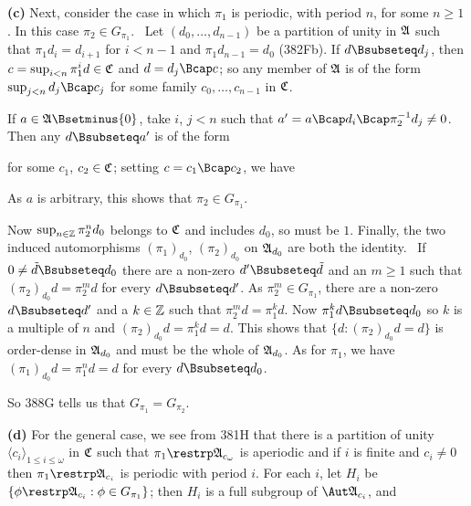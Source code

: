 {\medskip
     
{\bf (c)} Next, consider the case in which $\pi_1$ is periodic, with
period $n$, for some $n\ge 1$.   In this case $\pi_2\in G_{\pi_1}$.
\Prf\ Let $(d_0,\ldots,d_{n-1})$
be a partition of unity in $\frak A$ such that $\pi_1d_i=d_{i+1}$ for
$i<n-1$ and $\pi_1d_{n-1}=d_0$ (382Fb).   If $d\Bsubseteq d_j$, then
$c=\sup_{i<n}\pi_1^id\in\frak C$ and $d=d_j\Bcap c$;  so any member of
$\frak A$ is of the form $\sup_{j<n}d_j\Bcap c_j$ for some family
$c_0,\ldots,c_{n-1}$ in $\frak C$.
     
If $a\in\frak A\Bsetminus\{0\}$, take $i$,
$j<n$ such that $a'=a\Bcap d_i\Bcap\pi_2^{-1}d_j\ne 0$.   Then any
$d\Bsubseteq a'$ is of the form
     
     
\noindent for some $c_1$, $c_2\in\frak C$;  setting $c=c_1\Bcap c_2$, we
have
     
     
\noindent As $a$ is arbitrary, this shows that
$\pi_2\in G_{\pi_1}$.\ \Qed
     
Now $\sup_{n\in\Bbb Z}\pi_2^nd_0$
belongs to $\frak C$ and includes $d_0$, so must be $1$.   Finally,
the two induced automorphisms $(\pi_1)_{d_0}$,
$(\pi_2)_{d_0}$ on $\frak A_{d_0}$ are both the identity.   \Prf\
If $0\ne\tilde d\Bsubseteq d_0$ there are a non-zero
$d'\Bsubseteq\tilde d$ and an $m\ge 1$ such that
$(\pi_2)_{d_0}d=\pi_2^md$ for every $d\Bsubseteq d'$.   As
$\pi_2^m\in G_{\pi_1}$, there are a
non-zero $d\Bsubseteq d'$ and a $k\in\Bbb Z$ such that
$\pi_2^md=\pi_1^kd$.   Now $\pi_1^kd\Bsubseteq d_0$ so $k$ is a multiple
of $n$ and $(\pi_2)_{d_0}d=\pi_1^kd=d$.   This shows that
$\{d:(\pi_2)_{d_0}d=d\}$ is order-dense in $\frak A_{d_0}$ and must be
the whole of $\frak A_{d_0}$.   As for $\pi_1$, we have
$(\pi_1)_{d_0}d=\pi_1^nd=d$ for every $d\Bsubseteq d_0$.\ \Qed
     
So 388G tells us that $G_{\pi_1}=G_{\pi_2}$.
     
\medskip
     
{\bf (d)} For the general case, we see from 381H that there is a
partition of unity $\langle c_i\rangle_{1\le i\le\omega}$ in $\frak C$
such that $\pi_1\restrp\frak A_{c_{\omega}}$ is aperiodic and if $i$ is
finite and $c_i\ne 0$ then $\pi_1\restrp\frak A_{c_i}$ is periodic with
period $i$.   For each $i$, let $H_i$ be
$\{\phi\restrp\frak A_{c_i}:\phi\in G_{\pi_1}\}$;  then $H_i$ is a full
subgroup of $\Aut\frak A_{c_i}$, and
     
}
